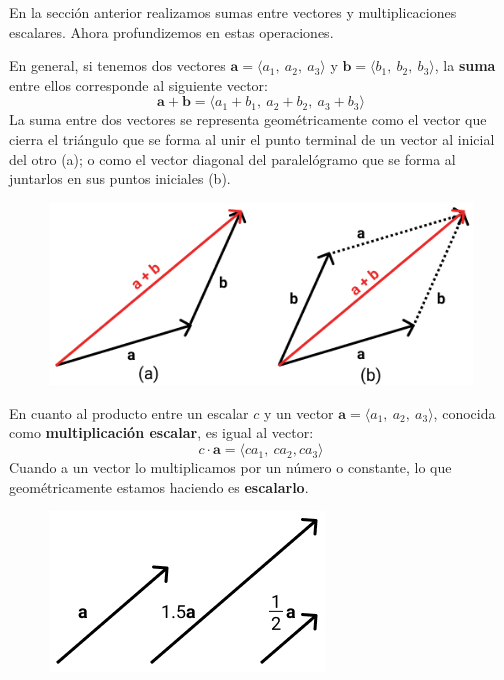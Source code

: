\documentclass[12pt]{article}
\begin{document}
En la sección anterior realizamos sumas entre vectores y multiplicaciones escalares. Ahora profundizemos en estas operaciones.

En general, si tenemos dos vectores $\mathbf{a} = \langle a_{1}, \ a_{2}, \ a_{3} \rangle$ y $\mathbf{b} = \langle b_{1}, \ b_{2}, \ b_{3} \rangle$, la \textbf{suma} entre ellos corresponde al siguiente vector:
\[
  \mathbf{a} + \mathbf{b} = \langle a_{1} + b_{1}, \ a_{2} + b_{2}, \ a_{3} + b_{3} \rangle
\]
La suma entre dos vectores se representa geométricamente como el vector que cierra el triángulo que se forma al unir el punto terminal de un vector al inicial del otro (a); o como el vector diagonal del paralelógramo que se forma al juntarlos en sus puntos iniciales (b).

\begin{figure}[hbt!]
\centering
\includegraphics[scale=0.5]{img/vector-sums.jpg}
\end{figure}

En cuanto al producto entre un escalar $c$ y un vector $\mathbf{a} = \langle a_{1}, \ a_{2}, \ a_{3} \rangle$, conocida como \textbf{multiplicación escalar}, es igual al vector:
\[
  c \cdot \mathbf{a} = \langle ca_{1}, \ ca_{2}, ca_{3} \rangle
\]
Cuando a un vector lo multiplicamos por un número o constante, lo que geométricamente estamos haciendo es \textbf{escalarlo}.

\begin{figure}[hbt!]
\centering
\includegraphics[scale=0.45]{img/scalar-mult.jpg}
\end{figure}
\end{document}
